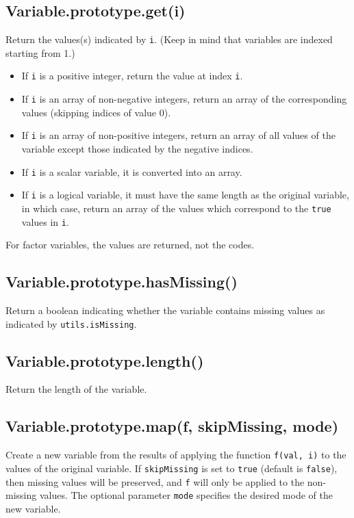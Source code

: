 \documentclass{article}
\begin{document}
    \subsection{Variable.prototype.get(i)}
    Return the values(s) indicated by \texttt{i}.  (Keep in mind that variables
are indexed starting from 1.)


\begin{itemize}

\item If \texttt{i} is a positive integer, return the value at index \texttt{i}.

\item If \texttt{i} is an array of non-negative integers, return an array of
the corresponding values (skipping indices of value 0).

\item If \texttt{i} is an array of non-positive integers, return an array of
all values of the variable except those indicated by the negative indices.

\item If \texttt{i} is a scalar variable, it is converted into an array.

\item If \texttt{i} is a logical variable, it must have the same length as the original
variable, in which case, return an array of the values which correspond to the
\texttt{true} values in \texttt{i}.

\end{itemize}

For factor variables, the values are returned, not the codes.


    \subsection{Variable.prototype.hasMissing()}
    Return a boolean indicating whether the variable contains missing values
as indicated by \texttt{utils.isMissing}.


    \subsection{Variable.prototype.length()}
    Return the length of the variable.


    \subsection{Variable.prototype.map(f, skipMissing, mode)}
    Create a new variable from the results of applying the function \texttt{f(val, i)} to the
values of the original variable. If \texttt{skipMissing} is set to \texttt{true} (default is \texttt{false}),
then missing values will be preserved, and \texttt{f} will only be applied to the non-missing
values. The optional parameter \texttt{mode} specifies the desired mode of the new variable.
\end{document}
